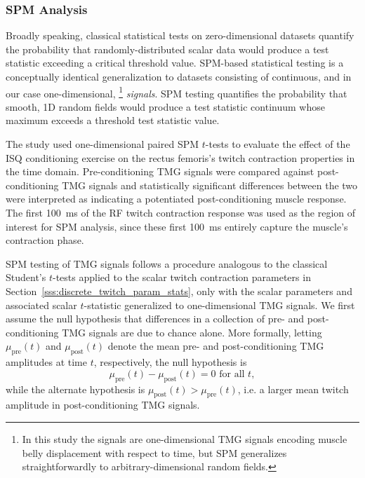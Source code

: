 \documentclass[utf8]{style/FrontiersinHarvard}
\begin{document}
\subsubsection{SPM Analysis} \label{sss:spm_analysis}
Broadly speaking, classical statistical tests on zero-dimensional datasets quantify the probability that randomly-distributed scalar data would produce a test statistic exceeding a critical threshold value.
SPM-based statistical testing is a conceptually identical generalization to datasets consisting of continuous, and in our case one-dimensional,%
\footnote{In this study the signals are one-dimensional TMG signals encoding muscle belly displacement with respect to time, but SPM generalizes straightforwardly to arbitrary-dimensional random fields.}
\textit{signals}.
SPM testing quantifies the probability that smooth, 1D random fields would produce a test statistic continuum whose maximum exceeds a threshold test statistic value.

The study used one-dimensional paired SPM $ t $-tests to evaluate the effect of the ISQ conditioning exercise on the rectus femoris's twitch contraction properties in the time domain.
Pre-conditioning TMG signals were compared against post-conditioning TMG signals and statistically significant differences between the two were interpreted as indicating a potentiated post-conditioning muscle response.
The first \SI{100}{\milli \second} of the RF twitch contraction response was used as the region of interest for SPM analysis, since these first \SI{100}{\milli \second} entirely capture the muscle's contraction phase.

SPM testing of TMG signals follows a procedure analogous to the classical Student's $ t $-tests applied to the scalar twitch contraction parameters in Section~\ref{sss:discrete_twitch_param_stats}, only with the scalar parameters and associated scalar $ t $-statistic generalized to one-dimensional TMG signals.
We first assume the null hypothesis that differences in a collection of pre- and post-conditioning TMG signals are due to chance alone.
More formally, letting $ \mu_{\mathrm{pre}}(t) $ and $ \mu_{\mathrm{post}}(t) $ denote the mean pre- and post-conditioning TMG amplitudes at time $ t $, respectively, the null hypothesis is
\begin{equation}
    \mu_{\text{pre}}(t) - \mu_{\text{post}} (t) = 0 \text{ for all } t, \label{eq:spm_null_hypothesis}
\end{equation}
while the alternate hypothesis is $ \mu_{\text{post}}(t) > \mu_{\text{pre}}(t) $, i.e. a larger mean twitch amplitude in post-conditioning TMG signals.
\end{document}
